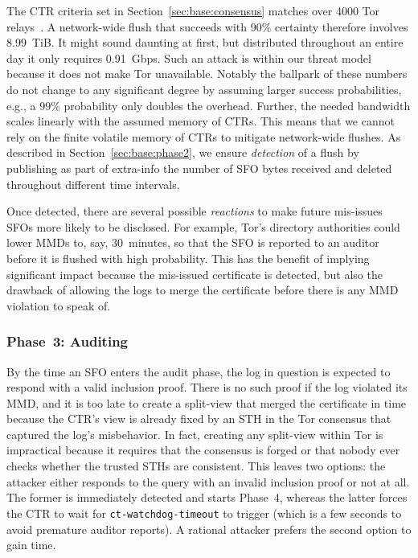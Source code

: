 The CTR criteria set in Section~\ref{sec:base:consensus} matches over
4000 Tor relays~\cite{relay-by-flag}.  A network-wide flush that succeeds with
90\% certainty therefore involves 8.99~TiB.  It might sound daunting at first,
but distributed throughout an entire day it only requires 0.91~Gbps. Such an
attack is within our threat model because it does not make Tor unavailable.
Notably the ballpark of these numbers do not change to any significant degree by
assuming larger success probabilities, e.g., a 99\% probability only doubles the
overhead. Further, the needed bandwidth scales linearly with the assumed memory
of CTRs.  This means that we cannot rely on the finite volatile memory of CTRs
to mitigate network-wide flushes.  As described in
Section~\ref{sec:base:phase2}, we ensure \emph{detection} of a flush by
publishing as part of extra-info the number of SFO bytes received and deleted
throughout different time intervals.

Once detected, there are several possible \emph{reactions} to make future
mis-issues SFOs more likely to be disclosed.  For example, Tor's directory
authorities could lower MMDs to, say, 30~minutes, so that the SFO is reported to
an auditor before it is flushed with high probability.  This has the benefit of
implying significant impact because the mis-issued certificate is detected, but
also the drawback of allowing the logs to merge the certificate before there is
any MMD violation to speak of. 


\subsubsection{Phase~3: Auditing} \label{sec:analysis:pr:phase3}
By the time an SFO enters the audit phase, the log in question is expected to
respond with a valid inclusion proof.  There is no such proof if the log
violated its MMD, and it is too late to create a split-view that merged the
certificate in time because the CTR's view is already fixed by an STH in the
Tor consensus that captured the log's misbehavior.  In fact, creating any
split-view within Tor is impractical because it requires that the consensus is
forged or that nobody ever checks whether the trusted STHs are consistent.
This leaves two options:
	the attacker either responds to the query with an invalid inclusion proof or
	not at all.
The former is immediately detected and starts Phase~4, whereas the latter forces
the CTR to wait for \texttt{ct-watchdog-timeout} to trigger (which is a
few seconds to avoid premature auditor reports).  A rational attacker prefers
the second option to gain time.

